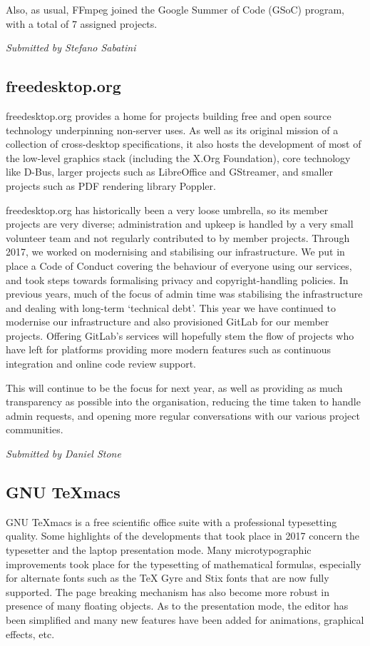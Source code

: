 \documentclass[a4paper]{report}
\begin{document}
Also, as usual, FFmpeg joined the Google Summer of Code (GSoC) program,
with a total of 7 assigned projects.

{\em Submitted by Stefano Sabatini}

\subsection{freedesktop.org}

freedesktop.org provides a home for projects building free and
open source technology underpinning non-server uses. As well as its
original mission of a collection of cross-desktop specifications, it
also hosts the development of most of the low-level graphics stack
(including the X.Org Foundation), core technology like D-Bus, larger
projects such as LibreOffice and GStreamer, and smaller projects such as
PDF rendering library Poppler.

freedesktop.org has historically been a very loose umbrella, so its
member projects are very diverse; administration and upkeep is handled
by a very small volunteer team and not regularly contributed to by
member projects. Through 2017, we worked on modernising and stabilising
our infrastructure. We put in place a Code of Conduct covering the
behaviour of everyone using our services, and took steps towards
formalising privacy and copyright-handling policies. In previous years,
much of the focus of admin time was stabilising the infrastructure and
dealing with long-term `technical debt'. This year we have continued to
modernise our infrastructure and also provisioned GitLab for our member
projects. Offering GitLab's services will hopefully stem the flow of
projects who have left for platforms providing more modern features such
as continuous integration and online code review support.

This will continue to be the focus for next year, as well as providing
as much transparency as possible into the organisation, reducing the
time taken to handle admin requests, and opening more regular
conversations with our various project communities.

{\em Submitted by Daniel Stone}

\subsection{GNU TeXmacs}

GNU TeXmacs is a free scientific office suite with a professional
typesetting quality.  Some highlights of the developments that took
place in 2017 concern the typesetter and the laptop presentation mode.
Many microtypographic improvements took place for the typesetting of
mathematical formulas, especially for alternate fonts such as the TeX
Gyre and Stix fonts that are now fully supported.  The page breaking
mechanism has also become more robust in presence of many floating
objects.  As to the presentation mode, the editor has been simplified
and many new features have been added for animations, graphical effects,
etc.
\end{document}
